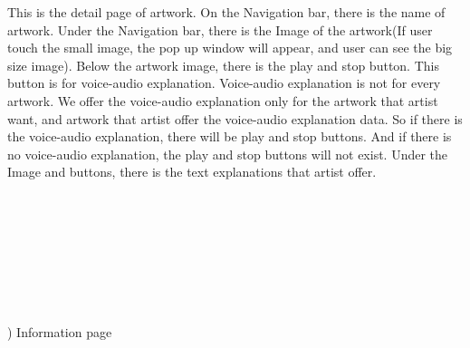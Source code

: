 \documentclass[conference]{IEEEtran}
\begin{document}
This is the detail page of artwork. On the Navigation bar, there is the name of artwork. Under the Navigation bar, there is the Image of the artwork(If user touch the small image, the pop up window will appear, and user can see the big size image). Below the artwork image, there is the play and stop button. This button is for voice-audio explanation. Voice-audio explanation is not for every artwork. We offer the voice-audio explanation only for the artwork that artist want, and artwork that artist offer the voice-audio explanation data. So if there is the voice-audio explanation, there will be play and stop buttons. And if there is no voice-audio explanation, the play and stop buttons will not exist. Under the Image and buttons, there is the text explanations that artist offer. \\\\\\\\\\\\\\\\\\
) Information page\\
\end{document}
